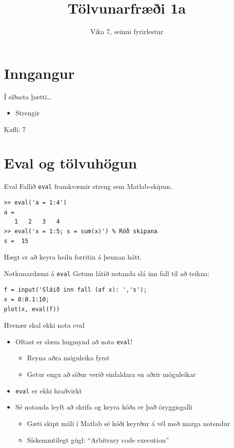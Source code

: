 \documentclass{beamer}
\title{Tölvunarfræði 1a}
\subtitle{Vika 7, seinni fyrirlestur}
\begin{document}
\begin{frame}
\titlepage
\end{frame}

\section{Inngangur}

\begin{frame}{Í síðasta þætti\ldots}
\begin{itemize}
 \item Strengir
\end{itemize}
Kafli: 7 
\end{frame}

\section{Eval og tölvuhögun}

\begin{frame}[fragile]{Eval}
Fallið \texttt{eval} framkvæmir streng sem Matlab-skipun.

\begin{verbatim}
>> eval('a = 1:4')
a =
   1   2   3   4
>> eval('x = 1:5; s = sum(x)') % Röð skipana
s =  15
\end{verbatim}

Hægt er að keyra heilu forritin á þennan hátt.
\end{frame}

\begin{frame}[fragile]{Notkunardæmi á \texttt{eval}}
Getum látið notanda slá inn fall til að teikna:
\begin{verbatim}
f = input('Sláið inn fall (af x): ','s');
x = 0:0.1:10;
plot(x, eval(f))
\end{verbatim}
\end{frame}

\begin{frame}{Hvenær skal ekki nota eval}
\begin{itemize}
 \item Oftast er slæm hugmynd að nota \texttt{eval}!
 \begin{itemize}
  \item Reyna aðra möguleika fyrst
  \item Getur engu að síður verið einfaldara en aðrir möguleikar
 \end{itemize}
 \item \texttt{eval} er ekki hraðvirkt
 \item Sé notanda leyft að skrifa og keyra kóða er það öryggisgalli
 \begin{itemize}
  \item Gæti skipt máli í Matlab sé kóði keyrður á vél með marga notendur
  \item Sískemmtilegt gúgl: ``Arbitrary code execution'' 
 \end{itemize}
\end{itemize}
\end{frame}
\end{document}
